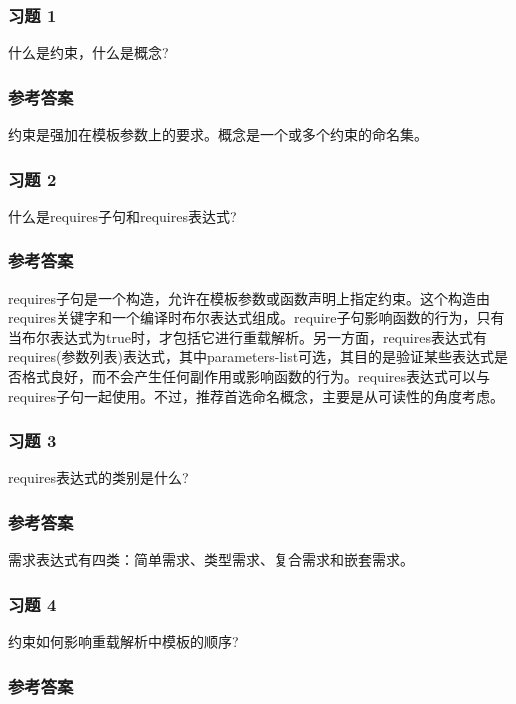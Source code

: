 \subsubsection{习题 1}

什么是约束，什么是概念?

\subsubsection{参考答案}

约束是强加在模板参数上的要求。概念是一个或多个约束的命名集。


\subsubsection{习题 2}

什么是requires子句和requires表达式?

\subsubsection{参考答案}

requires子句是一个构造，允许在模板参数或函数声明上指定约束。这个构造由requires关键字和一个编译时布尔表达式组成。require子句影响函数的行为，只有当布尔表达式为true时，才包括它进行重载解析。另一方面，requires表达式有requires(参数列表)表达式，其中parameters-list可选，其目的是验证某些表达式是否格式良好，而不会产生任何副作用或影响函数的行为。requires表达式可以与requires子句一起使用。不过，推荐首选命名概念，主要是从可读性的角度考虑。

\subsubsection{习题 3}

requires表达式的类别是什么?

\subsubsection{参考答案}

需求表达式有四类：简单需求、类型需求、复合需求和嵌套需求。

\subsubsection{习题 4}

约束如何影响重载解析中模板的顺序?

\subsubsection{参考答案}

